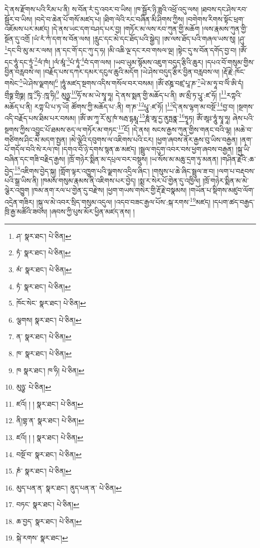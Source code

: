 དེ་ནས་རྫོགས་པའི་རིམ་པ་ནི། ས་བོན་རཾ་དུ་འབར་བ་ཡིས། །ཁ་སྦྱོར་ཉི་ཟླའི་འཕྲོ་འདུ་ལས། །ཐབས་དང་ཤེས་རབ་སྦྱོར་བ་ཡིས། །བདེ་བ་ཆེན་པོ་གསོ་མཛད་པ། །ཐིག་ལེའི་རང་བཞིན་མི་ཤིགས་ཀྱིས། །བགེགས་རིགས་སྟོང་ཕྲག་འཇོམས་པར་མཛད། །དེ་ནས་ཡང་དག་བཤད་པར་བྱ། །གཏོར་མ་ལས་རབ་ཀུན་གྱི་མཆོག །ལས་རྣམས་ཀུན་གྱི་སྔོན་དུ་འགྲོ །ཡཾ་རཾ་ཀཾ་དག་ས་བོན་ལས། །རླུང་དང་མེ་དང་ཐོད་པའི་སྒྱེད། །ཨ་ལས་ཐོད་པའི་གཞལ་ཡས་སུ། །ཤུ་\footnote{ཤ་  སྣར་ཐང་།  པེ་ཅིན། }དང་བི་མུ་མ་ར་ལས། །ན་དང་གོ་དང་ཀུ་ད་ཧ། །མི་འཆི་ལྔ་དང་རབ་གསལ་ལྔ། །སྟེང་དུ་ས་བོན་དགོད་བྱ་བ། །ཨོཾ་དང་ཧཱུཾ་དང་ཏྲཱཾ་\footnote{ཏཾ་  སྣར་ཐང་།  པེ་ཅིན། }ལཾ་ཁཾ། །ལཾ་མཱཾ་\footnote{མཾ་  སྣར་ཐང་།  པེ་ཅིན། }པཾ་ཏཱཾ་\footnote{ཏཾ་  སྣར་ཐང་།  པེ་ཅིན། }བཾ་དག་ལས། །ཡབ་ཡུམ་སྙོམས་འཇུག་བདུད་རྩིའི་ཆུར། །དཔའ་བོ་གསུམ་གྱིས་བྱིན་བརླབས་ལ། །བརྗོད་པས་དཀར་དམར་དངུལ་ཆུའི་མདོག །ཡེ་ཤེས་བདུད་རྩིར་བྱིན་བརླབས་ལ། །རྡོ་རྗེ་:ཁོང་གསེང་\footnote{ཁོང་སེང་  སྣར་ཐང་།  པེ་ཅིན། }ཡེ་ཤེས་ལྗགས།\footnote{ལྕགས།  སྣར་ཐང་།  པེ་ཅིན། } །ཧཱུཾ་མཛད་སྔགས་འདིས་གསོལ་བར་བསམ། །ཨོཾ་ཙཎྜ་བཛྲ་པཱ་ཎ་\footnote{ན་  སྣར་ཐང་།  པེ་ཅིན། }ཡེ་མ་ཧཱ་བ་ལིཾ་ཨི་དཾ། གྲྀཧྞ་གྲིཧྞ། ཁཱ་\footnote{ཁ་  སྣར་ཐང་།  པེ་ཅིན། }ཧི་:ཁཱ་ཧི།\footnote{ཁ  སྣར་ཐང་། ཁ་ཧི།  པེ་ཅིན། } མུཉྫ་\footnote{མུཉྩ་  པེ་ཅིན། }ཧོ་ས་མ་ཡེ་སྭཱ་ཧཱ། དེ་ནས་སྨན་གྱི་མཆོད་པ་ནི། ཨ་མྲྀ་ཏ་པཱུ་:ཛ་ཧོ། །\footnote{ཛའོ། ། །  སྣར་ཐང་།  པེ་ཅིན། }རཀྟའི་མཆོད་པ་ནི། རཀྟ་པི་པ་ཏ་ཡོ། ཚོགས་ཀྱི་མཆོད་པ་:ནི། ག་ཎ་\footnote{ནི།གྷ་ན་  སྣར་ཐང་།  པེ་ཅིན། }པཱུ་:ཛ་ཧོ། །\footnote{ཛའོ། ། །  སྣར་ཐང་།  པེ་ཅིན། }དེ་ནས་ལྷག་མ་བསྔོ་\footnote{བསྔོ་བ་  སྣར་ཐང་།  པེ་ཅིན། }བྱ་བ། །སྔགས་འདི་བརྗོད་པས་ཐིམ་པར་བསམ། །ཨོཾ་ཨ་ཀཱ་རོ་མུ་ཁཾ་སརྦ་དྷརྨཱ་\footnote{ཎཾ་  སྣར་ཐང་།  པེ་ཅིན། }ཎཱཾ་ཨཱ་དྱ་ནུཏྤནྣ་\footnote{མུད་པན་ན་  སྣར་ཐང་། ནུད་པན་ན་  པེ་ཅིན། }ཏྭཱཏ། ཨོཾ་ཨཱཿ་ཧཱུཾ་སྭཱ་ཧཱ། ཞེས་པའི་སྔགས་ཀྱིས་འབྱུང་པོ་ཐམས་ཅད་ལ་གཏོར་མ་གཏང་\footnote{བཏང་  སྣར་ཐང་།  པེ་ཅིན། }ངོ། །དེ་ནས། སངས་རྒྱས་ཀུན་གྱིས་གནང་བའི་ལྷ། །མཆེ་བ་གཙིགས་ཤིང་མེ་མདག་སྤྱན། །མེ་ལྕེའི་དབུགས་ལ་འཇིགས་པའི་ངར། །ཕྱག་ཞབས་ནོར་རྒྱས་བུ་ཡིས་བརྒྱན། །ནག་པོ་གདོལ་བའི་སེ་རལ་ཁ། །དགའ་བོ་ཉེ་དགས་སྙན་ཆ་མཛད། །སྦྲུལ་གདུག་འབར་བས་ཕྱག་ཞབས་བརྒྱན། །སྐུ་ཡི་བཞིན་དང་གཟི་བརྗིད་རྒྱས། །ཁྲོ་གཉེར་སྨིན་མ་དཔྲལ་བར་བསྡུས། །ཡ་སོས་མ་མཆུ་དྲག་ཏུ་མནན། །གཤིན་རྗེའི་:ཆ་བྱེད་\footnote{ཆ་བྱད་  སྣར་ཐང་།  པེ་ཅིན། }འཇིགས་བྱེད་སྐུ། །གློག་ལྟར་འཁྱུག་པའི་ལྗགས་འདྲིལ་ཞིང་། །གསུས་པ་ཆེ་ཞིང་སྦྲུལ་ཟ་བ། །ལག་པ་བརྡབས་པའི་སྒྲ་ཡིས་ནི། །ཁམས་གསུམ་རྣམས་ནི་འཇིགས་པར་བྱེད། །སྨ་ར་སེར་པོ་གྱེན་དུ་འཁྱིལ། །ཁྲོ་གཉེར་སྨིན་མ་མེ་ལྕེར་འཁྱུག །ཁམ་ནག་རལ་པ་གྱེན་དུ་བརྫེས། །ཕྱག་གཡས་གསེར་གྱི་རྡོ་རྗེ་བསྣམས། །གཡོན་པ་སྡིགས་མཛུབ་ལོག་འདྲེན་གཟིར། །སྐུ་ལ་མེ་འབར་སྲིད་གསུམ་འདུལ། །འདབ་བཟང་རྒྱལ་པོས་:སྐ་རགས་\footnote{སྐེ་རགས་  སྣར་ཐང་། }མཛད། །དཔག་ཚད་བརྒྱད་ཁྲི་རྒྱ་མཚོའི་ཟབས། །ཞབས་ཀྱི་པུས་མོར་ཕྱིན་མཛད་ནས། །
